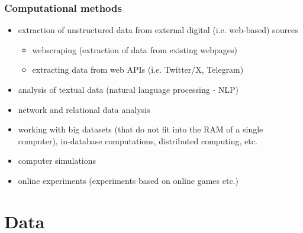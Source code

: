 \documentclass[aspectratio=169]{beamer}
\begin{document}
\begin{frame}
    \frametitle{Computational methods}
    \begin{itemize}
        \item<1> extraction of unstructured data from external digital (i.e. web-based) sources
        \begin{itemize}
            \item<1> webscraping (extraction of data from existing webpages)
            \item<1> extracting data from web APIs (i.e. Twitter/X, Telegram)
        \end{itemize}
        \item<1> analysis of textual data (natural language processing - NLP)
        \item<0> network and relational data analysis
        \item<0> working with big datasets (that do not fit into the RAM of a single computer), in-database computations, distributed computing, etc.
        \item<0> computer simulations
        \item<0> online experiments (experiments based on online games etc.)
    \end{itemize}
\end{frame}

\section[Data]{Data}
\end{document}
